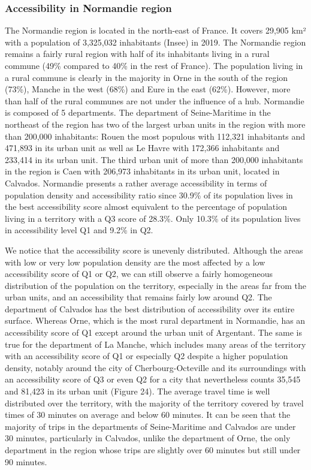 \subsubsection{Accessibility in Normandie region}

The Normandie region is located in the north-east of France. It covers 29,905
km² with a population of 3,325,032 inhabitants (Insee) in 2019. The Normandie
region remains a fairly rural region with half of its inhabitants living in a
rural commune (49\% compared to 40\% in the rest of France). The population
living in a rural commune is clearly in the majority in Orne in the south of the
region (73\%), Manche in the west (68\%) and Eure in the east (62\%). However,
more than half of the rural communes are not under the influence of a hub.
Normandie is composed of 5 departments. The department of Seine-Maritime in the
northeast of the region has two of the largest urban units in the region with
more than 200,000 inhabitants: Rouen the most populous with 112,321 inhabitants
and 471,893 in its urban unit as well as Le Havre with 172,366 inhabitants and
233,414 in its urban unit. The third urban unit of more than 200,000 inhabitants
in the region is Caen with 206,973 inhabitants in its urban unit, located in
Calvados. Normandie presents a rather average accessibility in terms of
population density and accessibility ratio since 30.9\% of its population lives
in the best accessibility score almost equivalent to the percentage of
population living in a territory with a Q3 score of 28.3\%. Only 10.3\% of its
population lives in accessibility level Q1 and 9.2\% in Q2.


We notice that the accessibility score is unevenly distributed. Although the
areas with low or very low population density are the most affected by a low
accessibility score of Q1 or Q2, we can still observe a fairly homogeneous
distribution of the population on the territory, especially in the areas far
from the urban units, and an accessibility that remains fairly low around Q2.
The department of Calvados has the best distribution of accessibility over its
entire surface. Whereas Orne, which is the most rural department in Normandie,
has an accessibility score of Q1 except around the urban unit of Argentant. The
same is true for the department of La Manche, which includes many areas of the
territory with an accessibility score of Q1 or especially Q2 despite a higher
population density, notably around the city of Cherbourg-Octeville and its
surroundings with an accessibility score of Q3 or even Q2 for a city that
nevertheless counts 35,545 and 81,423 in its urban unit (Figure 24). The average
travel time is well distributed over the territory, with the majority of the
territory covered by travel times of 30 minutes on average and below 60 minutes.
It can be seen that the majority of trips in the departments of Seine-Maritime
and Calvados are under 30 minutes, particularly in Calvados, unlike the
department of Orne, the only department in the region whose trips are slightly
over 60 minutes but still under 90 minutes.

